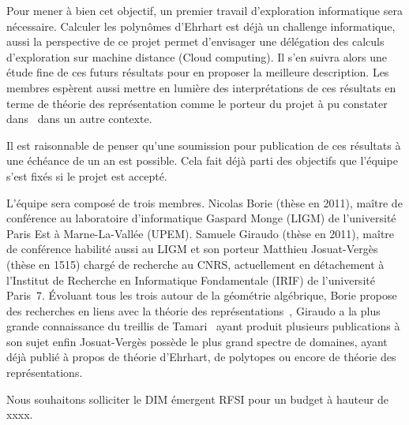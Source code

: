 \documentclass[a4paper, 10pt]{article}
\numberwithin{equation}{subsection}
\begin{document}
Pour mener à bien cet objectif, un premier travail d'exploration
informatique sera nécessaire. Calculer les polynômes d'Ehrhart est
déjà un challenge informatique, aussi la perspective de ce projet
permet d'envisager une délégation des calculs d'exploration sur
machine distance (Cloud computing). Il s'en suivra alors une étude
fine de ces futurs résultats pour en proposer la meilleure
description. Les membres espèrent aussi mettre en lumière des
interprétations de ces résultats en terme de théorie des
représentation comme le porteur du projet à pu constater
dans~\cite{MR3484760} dans un autre contexte.



Il est raisonnable de penser qu'une soumission pour publication de ces
résultats à une échéance de un an est possible. Cela fait déjà parti
des objectifs que l'équipe s'est fixés si le projet est accepté.



L'équipe sera composé de trois membres. Nicolas Borie (thèse en 2011),
maître de conférence au laboratoire d'informatique Gaspard Monge
(LIGM) de l'université Paris Est à Marne-La-Vallée (UPEM). Samuele
Giraudo (thèse en 2011), maître de conférence habilité aussi au LIGM
et son porteur Matthieu Josuat-Vergès (thèse en 1515) chargé de
recherche au CNRS, actuellement en détachement à l'Institut de
Recherche en Informatique Fondamentale (IRIF) de l'université Paris~7.
Évoluant tous les trois autour de la géométrie algébrique, Borie
propose des recherches en liens avec la théorie des
représentations~\cite{MR3448031}, Giraudo a la plus grande
connaissance du treillis de Tamari~\cite{MR2887627} ayant produit
plusieurs publications à son sujet enfin Josuat-Vergès possède le plus
grand spectre de domaines, ayant déjà publié à propos de théorie
d'Ehrhart, de polytopes ou encore de théorie des représentations.



Nous souhaitons solliciter le DIM émergent RFSI pour un budget à hauteur de xxxx.


\end{document}
